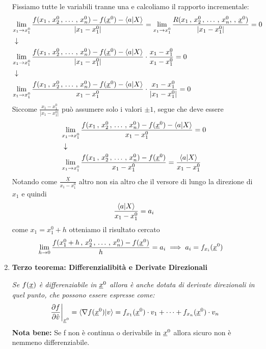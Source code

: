 \begin{enumerate}
	Fissiamo tutte le variabili tranne una e calcoliamo il rapporto incrementale:
	\begin{align}
	{}&\underset{x_1 \rightarrow x_1^0}{\lim} \,\frac{f(x_1\, , \, x_2^0\, , \, \dots \, , \, x_n^0) - f(\underline{x}^0) - \braket{a|X}}{|x_1 - x_1^0|}=\underset{x_1 \rightarrow x_1^0}{\lim} \, \frac{R(x_1\, , \, x_2^0\, , \, \dots \, , \, x_n^0, \, , \, \underline{x}^0)}{|x_1 - x_1^0|}= 0 \nonumber \\ &\downarrow \nonumber \\
	& \underset{x_1 \rightarrow x_1^0}{\lim} \,\frac{f(x_1\, , \, x_2^0\, , \, \dots \, , \, x_n^0) - f(\underline{x}^0) - \braket{a|X}}{|x_1 - x_1^0|} \cdot \frac{x_1 - x_1^0}{x_1 - x_1^0} = 0 \nonumber \\ &\downarrow \nonumber \\
	& \underset{x_1 \rightarrow x_1^0}{\lim} \,\frac{f(x_1\, , \, x_2^0\, , \, \dots \, , \, x_n^0) - f(\underline{x}^0) - \braket{a|X}}{x_1 - x_1^0} \cdot \frac{x_1 - x_1^0}{|x_1 - x_1^0|} = 0
	\end{align}
	Siccome $\frac{x_1 - x_1^0}{|x_1 - x_1^0|}$ può assumere solo i valori $\pm 1$, segue che deve essere
	\begin{align}
	{}&\underset{x_1 \rightarrow x_1^0}{\lim} \,\frac{f(x_1\, , \, x_2^0\, , \, \dots \, , \, x_n^0) - f(\underline{x}^0) - \braket{a|X}}{x_1 - x_1^0}=0 \nonumber \\ &\downarrow \nonumber \\
	&\underset{x_1 \rightarrow x_1^0}{\lim} \,\frac{f(x_1\, , \, x_2^0\, , \, \dots \, , \, x_n^0) - f(\underline{x}^0)}{x_1 - x_1^0} = \frac{\braket{a|X}}{x_1 - x_1^0}
	\end{align}
	Notando come $\frac{\underline{X}}{x_1 - x_1^0}$ altro non sia altro che il versore di lungo la direzione di $x_1$ e quindi
	\begin{align}
	\frac{\braket{a|X}}{x_1 - x_1^0}=a_i
	\end{align}
	come $x_1=x_1^0 + h$ otteniamo il risultato cercato
	\begin{align}
	{}&\underset{h \rightarrow 0}{\lim} \,\frac{f(x_1^0 + h \, , \, x_2^0\, , \, \dots \, , \, x_n^0) - f(\underline{x}^0)}{h} = a_i \implies a_i = f_{x_i}(\underline{x}^0)
	\end{align}
	
	\newpage
	
	\item \textbf{Terzo teorema: Differenzialibità e Derivate Direzionali}
	
	\textit{Se $f(\underline{x})$ è differenziabile in $\underline{x}^0$ allora è anche dotata di derivate direzionali in quel punto, che possono essere espresse come:}
		\begin{align}
	\left. \frac{\partial f}{\partial \hat{v}}\right|_{\underline{x}^0}= \braket{\nabla f(\underline{x}^0)|v}=f_{x_1}(\underline{x}^0) \cdot v_1 + \dots + f_{x_n}(\underline{x}^0) \cdot v_n
	\end{align}
	\textbf{Nota bene:} Se f non è continua o derivabile in $\underline{x}^0$ allora sicuro non è nemmeno differenziabile.
	

\end{enumerate}
